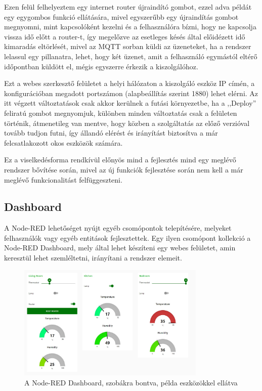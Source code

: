 \documentclass[]{thesis-ekf}
\theoremstyle{definition}
\theoremstyle{remark}
\begin{document}
Ezen felül felhelyeztem egy internet router újraindító gombot, ezzel adva példát egy egygombos funkció ellátására, mivel egyszerűbb egy újraindítás gombot megnyomni, 
mint kapcsolóként kezelni és a felhasználóra bízni, hogy ne kapcsolja vissza idő előtt a router-t, így megelőzve az esetleges 
késés által előidézett idő kimaradás eltörlését, mivel az MQTT sorban küldi az üzeneteket, ha a rendszer lelassul egy pillanatra, 
lehet, hogy két üzenet, amit a felhasználó egymástól eltérő időpontban küldött el, mégis egyszerre érkezik a kiszolgálóhoz.

Ezt a webes szerkesztő felületet a helyi hálózaton a kiszolgáló eszköz IP címén, a konfigurációban megadott portszámon (alapbeállítás szerint 1880) lehet elérni.
Az itt végzett változtatások csak akkor kerülnek a futási környezetbe, ha a ,,Deploy'' feliratú gombot megnyomjuk, különben minden változtatás
csak a felületen történik, átmenetileg van mentve, hogy közben a szolgáltatás az előző verzióval tovább tudjon futni, így
állandó elérést és irányítást biztosítva a már felcsatlakozott okos eszközök számára.

Ez a viselkedésforma
rendkívül előnyös mind a fejlesztés mind egy meglévő rendszer bővítése során, mivel az új funkciók
fejlesztése során nem kell a már meglévő funkcionalitást felfüggeszteni.

\subsection{Dashboard}
A Node-RED lehetőséget nyújt egyéb csomópontok telepítésére, melyeket felhasználók vagy egyéb entitások fejlesztettek. 
Egy ilyen csomópont kollekció a Node-RED Dashboard\cite{dashboard}, mely által lehet készíteni egy webes felületet, amin keresztül lehet szemléltetni, irányítani a rendszer elemeit. 
\begin{figure}[ht]
	\centering
	\includegraphics[width=0.8\textwidth]{images/dashboard.jpg}
	\caption{A Node-RED Dashboard, szobákra bontva, példa eszközökkel ellátva}
\end{figure}
\end{document}
